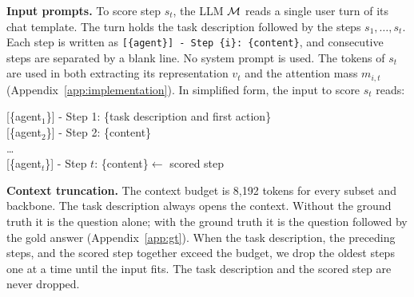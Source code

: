 

\textbf{Input prompts.}
To score step $s_t$, the LLM $\mathcal{M}$ reads a single user turn of its chat template. The turn holds the task description followed by the steps $s_1,\ldots,s_t$. Each step is written as \texttt{[\{agent\}] - Step \{i\}: \{content\}}, and consecutive steps are separated by a blank line. No system prompt is used. The tokens of $s_t$ are used in both extracting its
representation $v_t$ and the attention mass $m_{i,t}$ (Appendix~\ref{app:implementation}).
In simplified form, the input to score $s_t$ reads:
\begin{methodbox}
\ttfamily\small
{[}\{agent$_1$\}{]} - Step 1: \{task description and first action\}\\[2pt]
{[}\{agent$_2$\}{]} - Step 2: \{content\}\\[2pt]
\ldots\\[2pt]
{[}\{agent$_t$\}{]} - Step $t$: \{content\}\hfill$\leftarrow$ scored step\\
\end{methodbox}


\textbf{Context truncation.}
The context budget is 8{,}192 tokens for every subset and backbone. The task
description always opens the context. Without the ground truth it is the question
alone; with the ground truth it is the question followed by the gold answer
(Appendix~\ref{app:gt}). When the task description, the preceding steps, and the
scored step together exceed the budget, we drop the oldest steps one at a time
until the input fits. The task description and the scored step are never dropped.

